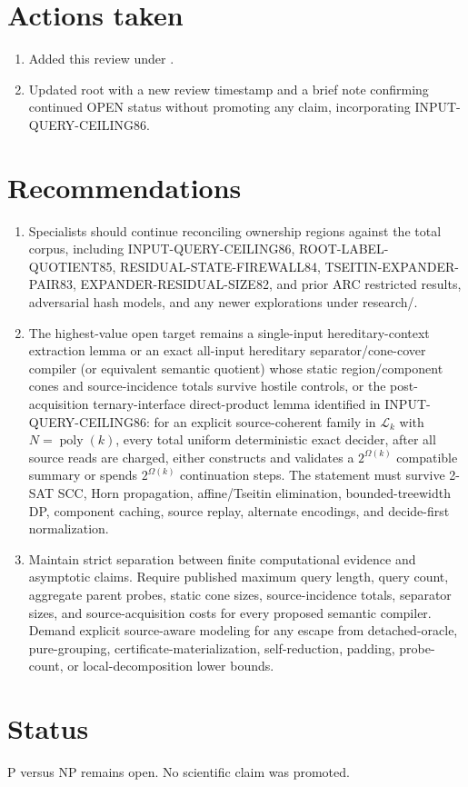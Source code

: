\documentclass[11pt]{article}
\begin{document}
\section{Actions taken}
\begin{enumerate}
\item Added this review under .
\item Updated root  with a new review timestamp and a brief note confirming continued OPEN status without promoting any claim, incorporating INPUT-QUERY-CEILING86.
\end{enumerate}

\section{Recommendations}
\begin{enumerate}
\item Specialists should continue reconciling ownership regions against the total corpus, including INPUT-QUERY-CEILING86, ROOT-LABEL-QUOTIENT85, RESIDUAL-STATE-FIREWALL84, TSEITIN-EXPANDER-PAIR83, EXPANDER-RESIDUAL-SIZE82, and prior ARC restricted results, adversarial hash models, and any newer explorations under research/.
\item The highest-value open target remains a single-input hereditary-context extraction lemma or an exact all-input hereditary separator/cone-cover compiler (or equivalent semantic quotient) whose static region/component cones and source-incidence totals survive hostile controls, or the post-acquisition ternary-interface direct-product lemma identified in INPUT-QUERY-CEILING86: for an explicit source-coherent family in $\mathcal L_k$ with $N=\operatorname{poly}(k)$, every total uniform deterministic exact decider, after all source reads are charged, either constructs and validates a $2^{\Omega(k)}$ compatible summary or spends $2^{\Omega(k)}$ continuation steps. The statement must survive 2-SAT SCC, Horn propagation, affine/Tseitin elimination, bounded-treewidth DP, component caching, source replay, alternate encodings, and decide-first normalization.
\item Maintain strict separation between finite computational evidence and asymptotic claims. Require published maximum query length, query count, aggregate parent probes, static cone sizes, source-incidence totals, separator sizes, and source-acquisition costs for every proposed semantic compiler. Demand explicit source-aware modeling for any escape from detached-oracle, pure-grouping, certificate-materialization, self-reduction, padding, probe-count, or local-decomposition lower bounds.
\end{enumerate}

\section{Status}
P versus NP remains open. No scientific claim was promoted.

\end{document}
